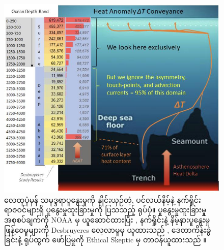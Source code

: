 \documentclass[10pt,twocolumn,letterpaper]{article}
\begin{document}
\begin{figure}[t]
\begin{center}
\includegraphics[width=1\textwidth]{deepsea.jpg}
\end{center}
   \caption{လေထုပုံမှန် သမုဒ္ဒရာပူနွေးမှုကို နှိုင်းယှဉ်တဲ့, ပင်လယ်နိမ့်နဲ့ နက်ရှိုင်းရာဇဝင်များရှိ ပူနွေးမှုထူးခြားမှုကို ပြသသည့် ရုပ်ပုံ။ ပူနွေးမှုထူးခြားမှုအစုစပ်ချက်ကို NOAA မှ ယူဆောင်ထားပြီး \cite{147}, နက်ရှိုင်းနဲ့ နိမ့်နားပူနွေးမှုဖြန့်ဝေမှုများကို Desbruyeres လေ့လာမှုမှ ယူထားသည် \cite{132}, ဒေတာကိန်းခွဲခြင်းနဲ့ ရုပ်ထွက် ဖော်ပြမှုကို Ethical Skeptic မှ တာဝန်ယူထားသည် \cite{129}။}
\label{fig:21}
\end{figure}
\end{document}
